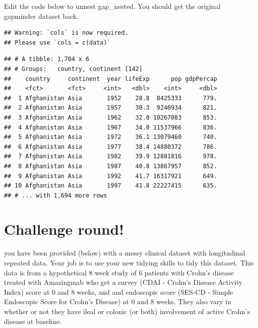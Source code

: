 \documentclass[
]{book}
\newenvironment{Shaded}{\begin{snugshade}}{\end{snugshade}}
\newcommand{\KeywordTok}[1]{\textcolor[rgb]{0.13,0.29,0.53}{\textbf{#1}}}
\newcommand{\NormalTok}[1]{#1}
\newcommand{\OperatorTok}[1]{\textcolor[rgb]{0.81,0.36,0.00}{\textbf{#1}}}
\newcommand{\StringTok}[1]{\textcolor[rgb]{0.31,0.60,0.02}{#1}}
\begin{document}
Edit the code below to unnest gap\_nested.
You should get the original gapminder dataset back.

\begin{Shaded}
\end{Shaded}

\begin{verbatim}
## Warning: `cols` is now required.
## Please use `cols = c(data)`
\end{verbatim}

\begin{verbatim}
## # A tibble: 1,704 x 6
## # Groups:   country, continent [142]
##    country     continent  year lifeExp      pop gdpPercap
##    <fct>       <fct>     <int>   <dbl>    <int>     <dbl>
##  1 Afghanistan Asia       1952    28.8  8425333      779.
##  2 Afghanistan Asia       1957    30.3  9240934      821.
##  3 Afghanistan Asia       1962    32.0 10267083      853.
##  4 Afghanistan Asia       1967    34.0 11537966      836.
##  5 Afghanistan Asia       1972    36.1 13079460      740.
##  6 Afghanistan Asia       1977    38.4 14880372      786.
##  7 Afghanistan Asia       1982    39.9 12881816      978.
##  8 Afghanistan Asia       1987    40.8 13867957      852.
##  9 Afghanistan Asia       1992    41.7 16317921      649.
## 10 Afghanistan Asia       1997    41.8 22227415      635.
## # ... with 1,694 more rows
\end{verbatim}

\hypertarget{challenge-round-1}{%
\section{Challenge round!}\label{challenge-round-1}}

you have been provided (below) with a messy clinical dataset with longitudinal repeated data. Your job is to use your new tidying skills to tidy this dataset. This data is from a hypothetical 8 week study of 6 patients with Crohn's disease treated with Amazingmab who get a survey (CDAI - Crohn's Disease Activity Index) score at 0 and 8 weeks, and and endoscopic score (SES-CD - Simple Endoscopic Score for Crohn's Disease) at 0 and 8 weeks. They also vary in whether or not they have ileal or colonic (or both) involvement of active Crohn's disease at baseline.
\end{document}
